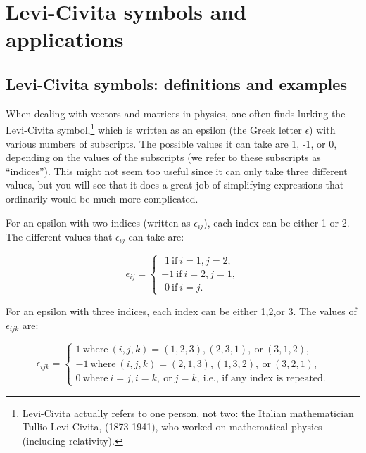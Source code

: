 \section{Levi-Civita symbols and applications}
\label{sec:SigmaApp:LeviCivitaAndApp}

\subsection{Levi-Civita symbols: definitions and examples}
\label{subsec:SigmaApp:LeviCivitaAndApp:LeviCivita}

When dealing with vectors and matrices in physics, one often finds lurking  the Levi-Civita symbol,\footnote{Levi-Civita actually refers to one person, not two: the Italian mathematician Tullio Levi-Civita, (1873-1941), who worked on mathematical physics (including relativity).} which is written as an epsilon (the Greek letter $\epsilon$) with various numbers of subscripts.  The possible values it can take are 1, -1, or 0, depending on the values of the subscripts (we refer to these subscripts as ``indices'').  This might not seem too useful since it can only take three different values, but you will see that it does a great job of simplifying expressions that ordinarily would be much more complicated.  

For an epsilon with two indices (written as $\epsilon_{ij}$), each index can be either 1 or 2. The different values that $\epsilon_{ij}$ can take are:

\[ \epsilon_{ij}=
\begin{cases}
\,\,1 ~ \text{if} ~ i=1, j=2,  \\
-1 ~ \text{if} ~ i=2, j=1,  \\
\,\, 0 ~ \text{if} ~ i=j.
\end{cases} \]

For an epsilon with three indices, each index can be either 1,2,or 3. The values of $\epsilon_{ijk}$ are:

\[ \epsilon_{ijk}=
\begin{cases}
1 ~ \text{where} ~ (i,j,k)= (1,2,3),  (2,3,1),  \mathrm{~or~}(3,1,2), \\
-1 ~ \text{where} ~ (i,j,k) = (2,1,3), (1,3,2),  \mathrm{~or~}(3,2,1),  \\
0 ~ \text{where} ~  i=j, i=k, ~ \text{or} ~ j=k, ~ \text{i.e., if any index is repeated.}
\end{cases} \]

